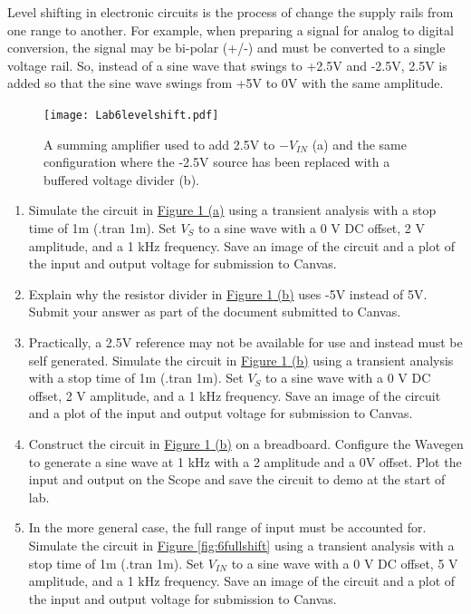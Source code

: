 Level shifting in electronic circuits is the process of change the supply rails from one range to another. For example, when preparing a signal for analog to digital conversion, the signal may be bi-polar (+/-) and must be converted to a single voltage rail. So, instead of a sine wave that swings to +2.5V and -2.5V, 2.5V is added so that the sine wave swings from +5V to 0V with the same amplitude. 

\begin{figure} [h]
	\centering
		\texttt{[image: Lab6levelshift.pdf]}
	\caption{A summing amplifier used to add 2.5V to $-V_{IN}$ (a) and the same configuration where the -2.5V source has been replaced with a buffered voltage divider (b).} \label{fig:6levelshift}
\end{figure}

\begin{enumerate}
	\item Simulate the circuit in \hyperref[fig:6levelshift]{Figure \ref*{fig:6levelshift} (a)} using a transient analysis with a stop time of 1m (.tran 1m). Set $V_{S}$ to a sine wave with a 0 V DC offset, 2 V amplitude, and a 1 kHz frequency. Save an image of the circuit and a plot of the input and output voltage for submission to Canvas. \label{itm:6ssec2itm1}
	\item Explain why the resistor divider in \hyperref[fig:6levelshift]{Figure \ref*{fig:6levelshift} (b)} uses -5V instead of 5V. Submit your answer as part of the document submitted to Canvas. \label{itm:6ssec2itm2}
	\item Practically, a 2.5V reference may not be available for use and instead must be self generated. Simulate the circuit in \hyperref[fig:6levelshift]{Figure \ref*{fig:6levelshift} (b)} using a transient analysis with a stop time of 1m (.tran 1m). Set $V_{S}$ to a sine wave with a 0 V DC offset, 2 V amplitude, and a 1 kHz frequency. Save an image of the circuit and a plot of the input and output voltage for submission to Canvas. \label{itm:6ssec2itm3}
	\item Construct the circuit in \hyperref[fig:6levelshift]{Figure \ref*{fig:6levelshift} (b)} on a breadboard. Configure the Wavegen to generate a sine wave at 1 kHz with a 2 amplitude and a 0V offset. Plot the input and output on the Scope and save the circuit to demo at the start of lab. \label{itm:6ssec2itm4}
	\item In the more general case, the full range of input must be accounted for. Simulate the circuit in \hyperref[fig:6fullshift]{Figure \ref*{fig:6fullshift}} using a transient analysis with a stop time of 1m (.tran 1m). Set $V_{IN}$ to a sine wave with a 0 V DC offset, 5 V amplitude, and a 1 kHz frequency. Save an image of the circuit and a plot of the input and output voltage for submission to Canvas. \label{itm:6ssec2itm5}
\end{enumerate}

